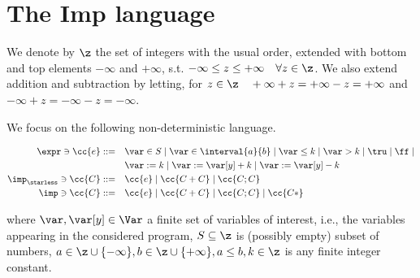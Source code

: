 \section{The Imp language}

We denote by \(\z\) the set of integers with the usual order, extended
with bottom and top elements \(-\infty\) and \(+\infty\),
s.t. \(-\infty \leq z \leq +\infty \quad \forall z \in \z\). We also
extend addition and subtraction by letting, for \(z \in \z \quad
+\infty + z = + \infty - z = + \infty\) and \(-\infty + z = - \infty
-z = - \infty\).

We focus on the following non-deterministic language.

\begin{align*}
  \expr \ni \cc{e} ::= & \quad \var \in S \mid \var \in \interval{a}{b} \mid \var \leq k \mid \var > k \mid \tru \mid \ff \mid \\
  & \quad \var := k \mid \var := \var[y] + k \mid \var := \var[y] - k \\
  \imp_\starless \ni \cc{C} ::= & \quad \cc{e} \mid \cc{C + C} \mid \cc{C ; C} \\
  \imp \ni \cc{C} ::= & \quad \cc{e} \mid \cc{C + C} \mid \cc{C ; C} \mid \cc{C*}
\end{align*}

where \(\var, \var[y] \in \Var\) a finite set of variables of interest, i.e.,
the variables appearing in the considered program, \(S\subseteq \z\)
is (possibly empty) subset of numbers, \(a \in \z\cup \{-\infty\},
b\in\z\cup\{+\infty\}, a\leq b, k \in \z\) is any finite integer
constant.
